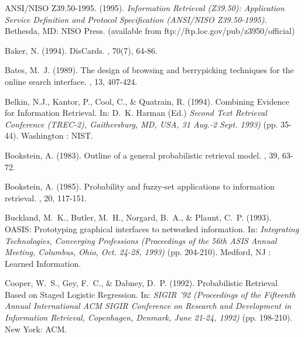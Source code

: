\begin{thebibliography}{99}

ANSI/NISO Z39.50-1995. (1995).
{\em Information Retrieval (Z39.50): Application Service Definition and
Protocol Specification (ANSI/NISO Z39.50-1995)}. Bethesda, MD: NISO
Press. (available from ftp://ftp.loc.gov/pub/z3950/official)

Baker, N. (1994).
\newblock DisCards.
, 70(7), 64-86.

Bates, M.~J. (1989).
\newblock The design of browsing and berrypicking techniques for
the online search interface.
, 13, 407-424.

Belkin, N.J., Kantor, P., Cool, C., \& Quatrain, R. (1994). 
\newblock Combining Evidence for Information Retrieval.
\newblock In: D.~K. Harman (Ed.) {\em Second Text Retrieval Conference (TREC-2), Gaithersburg, MD, 
USA, 31 Aug.-2 Sept. 1993)} (pp. 35-44).  Washington : NIST.


Bookstein, A. (1983). 
\newblock Outline of a general probabilistic retrieval
model. 
, 39, 63-72. 

Bookstein, A. (1985). 
\newblock Probability and fuzzy-set applications to 
information retrieval. 
,
     20, 117-151. 

Buckland, M.~K., Butler, M.~H., Norgard, B.~A., \& Plaunt, C.~P. (1993).
\newblock OASIS: Prototyping graphical interfaces to networked information.
\newblock In: {\em Integrating Technologies, Converging Professions  
(Proceedings of the 56th ASIS Annual Meeting, Columbus, Ohio, Oct. 24-28,
1993)} (pp. 204-210). Medford, NJ : Learned Information.

Cooper, W.~S., Gey, F.~C., \& Dabney, D.~P. (1992).
\newblock Probabilistic Retrieval Based on Staged Logistic Regression.
\newblock In: {\em SIGIR '92 (Proceedings of the Fifteenth Annual International
ACM SIGIR Conference on Research and Development in Information Retrieval,
Copenhagen, Denmark, June 21-24, 1992)} (pp. 198-210). New York: ACM.


\end{thebibliography}

